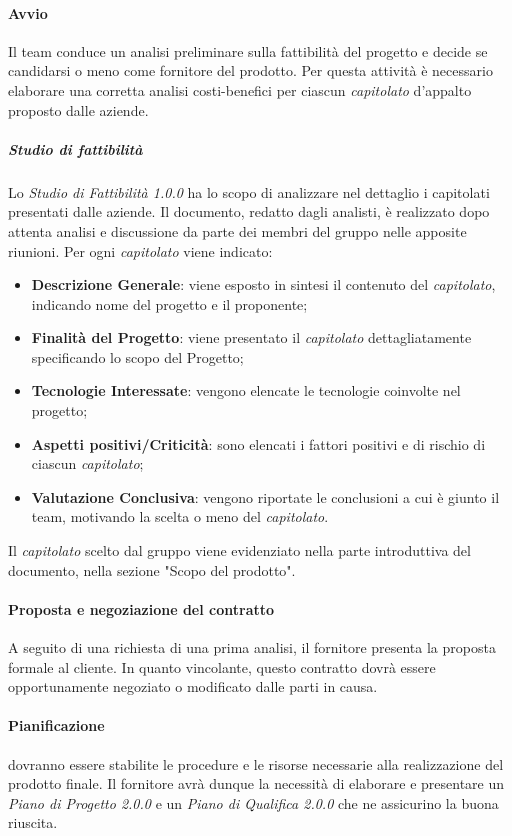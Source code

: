 \paragraph{Avvio}
Il team conduce un analisi preliminare sulla fattibilità del progetto e decide se candidarsi o meno come fornitore del prodotto. Per questa attività è necessario elaborare una corretta analisi costi-benefici per ciascun \textit{capitolato\glo} d'appalto proposto dalle aziende.
\subparagraph*{Studio di fattibilità}
Lo \textit{Studio di Fattibilità 1.0.0\doc} ha lo scopo di analizzare nel dettaglio i capitolati presentati dalle aziende. Il documento,  redatto dagli analisti, è realizzato dopo attenta analisi e discussione da parte dei membri del gruppo nelle apposite riunioni. Per ogni \textit{capitolato\glo} viene indicato:
\begin{itemize}
	\item \textbf{Descrizione Generale}: viene esposto in sintesi il contenuto del \textit{capitolato\glos}, indicando nome del progetto e il proponente;
	\item \textbf{Finalità del Progetto}: viene presentato il \textit{capitolato\glo} dettagliatamente specificando lo scopo del Progetto;
	\item \textbf{Tecnologie Interessate}: vengono elencate le tecnologie coinvolte nel progetto;
	\item \textbf{Aspetti positivi/Criticità}: sono elencati i fattori positivi e di rischio di ciascun \textit{capitolato\glos};
	\item \textbf{Valutazione Conclusiva}: vengono riportate le conclusioni a cui è giunto il team, motivando la scelta o meno del \textit{capitolato\glos}.
\end{itemize}
Il \textit{capitolato\glo} scelto dal gruppo viene evidenziato nella parte introduttiva del documento, nella sezione "Scopo del prodotto".

\paragraph{Proposta e negoziazione del contratto}
A seguito di una richiesta di una prima analisi, il fornitore presenta la proposta formale al cliente. In quanto vincolante, questo contratto dovrà essere opportunamente negoziato o modificato dalle parti in causa.

\paragraph{Pianificazione}  dovranno essere stabilite le procedure e le risorse necessarie alla realizzazione del prodotto finale. Il fornitore avrà dunque la necessità di elaborare e presentare un \textit{Piano di Progetto 2.0.0\doc} e un \textit{Piano di Qualifica 2.0.0\doc} che ne assicurino la buona riuscita.

